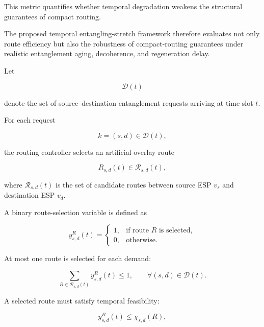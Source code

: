 This metric quantifies whether temporal degradation weakens the structural guarantees of compact routing.

The proposed temporal entangling-stretch framework therefore evaluates not only route efficiency but also the robustness of compact-routing guarantees under realistic entanglement aging, decoherence, and regeneration delay.

Let

\begin{equation}
    \mathcal{D}(t)
\end{equation}

denote the set of source--destination entanglement requests arriving at time slot $t$.

For each request

\begin{equation}
    k=(s,d)
    \in
    \mathcal{D}(t),
\end{equation}

the routing controller selects an artificial-overlay route

\begin{equation}
    R_{s,d}(t)
    \in
    \mathcal{R}_{s,d}(t),
\end{equation}

where $\mathcal{R}_{s,d}(t)$ is the set of candidate routes between source ESP $v_s$ and destination ESP $v_d$.

A binary route-selection variable is defined as

\begin{equation}
    y_{s,d}^{R}(t)
    =
    \begin{cases}
    1, & \text{if route $R$ is selected},\\
    0, & \text{otherwise}.
    \end{cases}
\end{equation}

At most one route is selected for each demand:

\begin{equation}
    \sum_{R\in\mathcal{R}_{s,d}(t)}
    y_{s,d}^{R}(t)
    \leq
    1,
    \qquad
    \forall (s,d)\in\mathcal{D}(t).
\end{equation}

A selected route must satisfy temporal feasibility:

\begin{equation}
    y_{s,d}^{R}(t)
    \leq
    \chi_{s,d}(R),
\end{equation}

